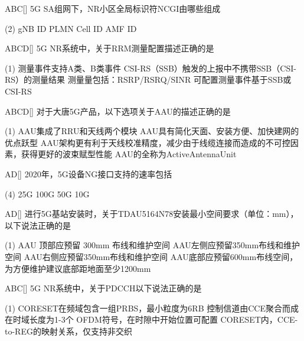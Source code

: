 \begin{choice}{\;ABC\;}[]
    5G SA组网下，NR小区全局标识符NCGI由哪些组成
    \begin{tasks}(2)
        \task  gNB ID
        \task PLMN
        \task Cell ID
        \task AMF ID
    \end{tasks}
\end{choice}


\begin{choice}{\;ABCD\;}[]
    5G NR系统中，关于RRM测量配置描述正确的是
    \begin{tasks}(1)
        \task 测量事件支持A类、B类事件
        \task CSI-RS（SSB）触发的上报中不携带SSB（CSI-RS）的测量结果
        \task 测量量包括：RSRP/RSRQ/SINR
        \task 可配置测量事件基于SSB或CSI-RS
    \end{tasks}
\end{choice}



\begin{choice}{\;ABCD\;}[]
    对于大唐5G产品，以下选项关于AAU的描述正确的是
    \begin{tasks}(1)
        \task AAU集成了RRU和天线两个模块
        \task AAU具有简化天面、安装方便、加快建网的优点跃型
        \task AAU架构更有利于天线校准精度，减少由于线缆连接而造成的不可控因素，获得更好的波束赋型性能
        \task AAU的全称为ActiveAntennaUnit
    \end{tasks}
\end{choice}


\begin{choice}{\;AD\;}[]
    2020年，5G设备NG接口支持的速率包括
    \begin{tasks}(4)
        \task 25G
        \task 100G
        \task 50G
        \task 10G
    \end{tasks}
\end{choice}



\begin{choice}{\;AD\;}[]
    进行5G基站安装时，关于TDAU5164N78安装最小空间要求（单位：mm），以下说法正确的是
    \begin{tasks}(1)
        \task AAU 顶部应预留 300mm 布线和维护空间
        \task AAU左侧应预留350mm布线和维护空间
        \task AAU右侧应预留350mm布线和维护空间
        \task AAU底部应预留600mm布线空间，为方便维护建议底部距地面至少1200mm
    \end{tasks}
\end{choice}



\begin{choice}{\;ABC\;}[]
    5G NR系统中，关于PDCCH以下说法正确的是

    \begin{tasks}(1)
        \task CORESET在频域包含一组PRBS，最小粒度为6RB
        \task 控制信道由CCE聚合而成
        \task 在时域长度为1-3个 OFDM符号，在时隙中开始位置可配置
        \task CORESET内，CCE-to-REG的映射关系，仅支持非交织
    \end{tasks}
\end{choice}



